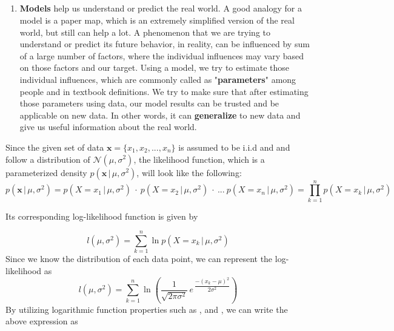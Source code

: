 \documentclass{homework2_template}
\begin{document}
\subsection{}
\begin{enumerate}
    \item \textbf{Models} help us understand or predict the real world. A good analogy for a model is a paper map, which is an extremely simplified version of the real world, but still can help a lot. A phenomenon that we are trying to understand or predict its future behavior, in reality, can be influenced by sum of a large number of factors, where the individual influences may vary based on those factors and our target. Using a model, we try to estimate those individual influences, which are commonly called as "\textbf{parameters}" among people and in textbook definitions. We try to make sure that after estimating those parameters using data, our model results can be trusted and be applicable on new data. In other words, it can \textbf{generalize} to new data and give us useful information about the real world. 
\end{enumerate}

\exercise{}
Since the given set of data $\bm{x} = \{ {x}_1, {x}_2, ..., {x}_n \}$ is assumed to be i.i.d and and follow a distribution of $ \mathcal{N}(\mu,\sigma^2)$, the likelihood function, which is a parameterized density $p(\bm{x}\,|\,\mu,\sigma^2)$, will look like the following:
\begin{equation}
  p(\bm{x}\,|\,\mu,\sigma^2) = p(X = x_1\,|\,\mu,\sigma^2)\ \cdot \ p(X = x_2\,|\,\mu,\sigma^2) \ \cdot \ ...\ p(X = x_n\,|\,\mu,\sigma^2)
  = \prod_{k = 1}^n p(X = x_k\,|\,\mu,\sigma^2)
\end{equation} 

Its corresponding log-likelihood function is given by

\begin{equation}
    l(\mu,\sigma^2) = \sum_{k=1}^n \ln p(X = x_k\,|\,\mu,\sigma^2)
\end{equation}
Since we know the distribution of each data point, we can represent the log-likelihood as
\begin{equation}
l(\mu,\sigma^2) = \sum_{k=1}^n \ln \left(\dfrac{1}{\sqrt{2 \pi \sigma^2}}\, e^{\,\dfrac{-(x_k- \mu)^2}{2\sigma^2}}\right)
\end{equation}
By utilizing  logarithmic function properties such as ,  and , we can write the above expression as
\end{document}
